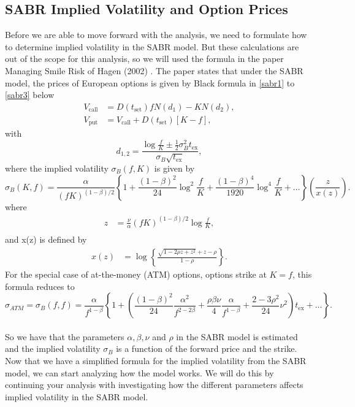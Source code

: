 \subsection{SABR Implied Volatility and Option Prices}
Before we are able to move forward with the analysis,
we need to formulate how to determine implied volatility in the SABR model. 
But these calculations are out of the scope for this analysis,
so we will used the formula in the paper Managing Smile Risk 
of Hagen (2002) \cite{Smile}. The paper states that
under the SABR model, the prices of European options 
is given by Black formula in \autoref{sabr1} to \autoref{sabr3}
below
\begin{align}
    V_{\text{call}} &= D(t_{\text{set}})fN(d_1) - KN(d_2),  \label{sabr1}\\
    V_{\text{put}} &= V_{\text{call}} + D(t_{\text{set}})[K - f], \label{sabr2}
\end{align}
with
\begin{equation}
    d_{1,2} = \frac{\log \frac{f}{K} \pm \frac{1}{2}\sigma_B^2 t_{\text{ex}}}{\sigma_B \sqrt{t_{\text{ex}}}}, \label{sabr3}
\end{equation}
where the implied volatility $\sigma_B(f, K)$ is given by
\begin{equation}
    \sigma_B(K, f) = \frac{\alpha}{(fK)^{(1-\beta)/2}} \left\{ 1 + \frac{(1-\beta)^2}{24} \log^2 \frac{f}{K} + \frac{(1-\beta)^4}{1920} \log^4 \frac{f}{K} + \ldots \right\} \left( \frac{z}{x(z)} \right).
    \label{sigma_B}
\end{equation}
where
\begin{align}
    z &= \frac{\nu}{\alpha}(fK)^{(1-\beta)/2} \log \frac{f}{K}, \\
\end{align}
and x(z) is defined by
\begin{align}
    x(z) &= \log \left\{ \frac{\sqrt{1-2\rho z + z^2} + z - \rho}{1 - \rho} \right\}.
\end{align}
For the special case of at-the-money (ATM) options, options strike at $K = f$, this formula reduces to
\begin{equation}
    \sigma_{ATM} = \sigma_B(f, f) = \frac{\alpha}{f^{1-\beta}} \left\{ 1 + \left( \frac{(1-\beta)^2}{24} \frac{\alpha^2}{f^{2-2\beta}} + \frac{\rho \beta \nu}{4} \frac{\alpha}{f^{1-\beta}} + \frac{2-3\rho^2}{24} \nu^2 \right) t_{\text{ex}} + \ldots \right\}.
    \label{sigma_ff}
\end{equation}
\\
So we have that the parameters $\alpha, \beta, \nu$ and $\rho$  in the SABR model is estimated and the implied volatility $\sigma_B$
is a function of the forward price and the strike. Now that we have a simplified formula for the implied 
volatility from the SABR model, we can start analyzing 
how the model works. We will do this by continuing your
analysis with investigating how the different parameters 
affects implied volatility in the SABR model. 

